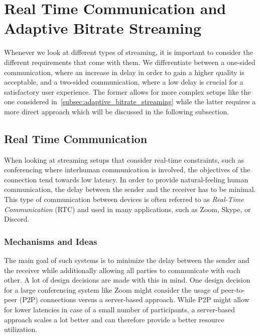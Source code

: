 \section{Real Time Communication and Adaptive Bitrate Streaming}\label{sec:rt_and_adaptive_bitrate_streaming}

Whenever we look at different types of streaming, it is important to consider the 
different requirements that come with them.
We differentiate between a one-sided communication, where an increase in delay 
in order to gain a higher quality is acceptable, and a two-sided communication, 
where a low delay is crucial for a satisfactory user experience.
The former allows for more complex setups like the one considered 
in~\autoref{subsec:adaptive_bitrate_streaming} while the latter requires
a more direct approach which will be discussed in the following subsection.

\subsection{Real Time Communication}
When looking at streaming setups that consider real-time constraints, such as conferencing 
where interhuman communication is involved, the objectives of the connection tend towards
low latency.
In order to provide natural-feeling human communication, the delay between the sender 
and the receiver has to be minimal.
This type of communication between devices is often referred to as \textit{Real-Time Communication} 
(RTC) and used in many applications, such as Zoom, Skype, or Discord.

\subsubsection{Mechanisms and Ideas}
The main goal of such systems is to minimize the delay between the sender and the receiver
while additionally allowing all parties to communicate with each other.
A lot of design decisions are made with this in mind.
One design decision for a large conferencing system like Zoom
might consider the usage of peer-to-peer (P2P) connections versus a server-based
approach.
While P2P might allow for lower latencies in case of a small number of participants,
a server-based approach scales a lot better and can therefore provide a better
resource utilization.

